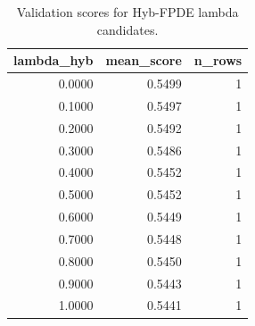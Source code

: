 \begin{table}[t]
\caption{Validation scores for Hyb-FPDE lambda candidates.}
\label{tab:lambda_distribution_computed}
\centering
\begin{tabular}{rrr}
\toprule
lambda\_hyb & mean\_score & n\_rows \\
\midrule
0.0000 & 0.5499 & 1 \\
0.1000 & 0.5497 & 1 \\
0.2000 & 0.5492 & 1 \\
0.3000 & 0.5486 & 1 \\
0.4000 & 0.5452 & 1 \\
0.5000 & 0.5452 & 1 \\
0.6000 & 0.5449 & 1 \\
0.7000 & 0.5448 & 1 \\
0.8000 & 0.5450 & 1 \\
0.9000 & 0.5443 & 1 \\
1.0000 & 0.5441 & 1 \\
\bottomrule
\end{tabular}

\end{table}
